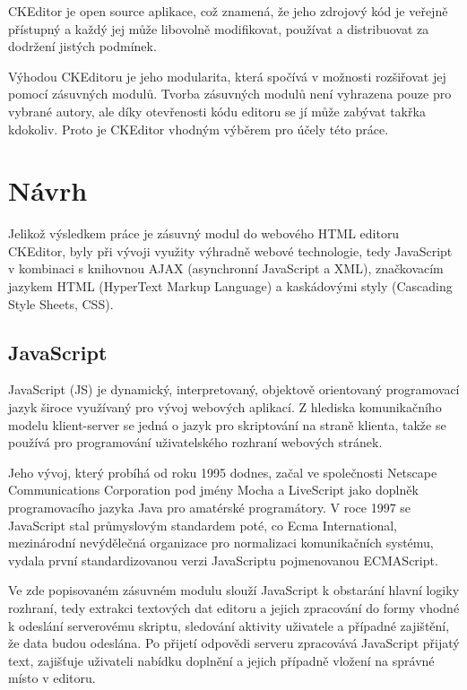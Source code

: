\documentclass[a4paper,11pt]{article}
\begin{document}
CKEditor je open source aplikace, což znamená, že jeho zdrojový kód je veřejně přístupný a každý jej může libovolně modifikovat, používat a distribuovat za dodržení jistých podmínek. 

Výhodou CKEditoru je jeho modularita, která spočívá v možnosti rozšiřovat jej pomocí zásuvných modulů. Tvorba zásuvných modulů není vyhrazena pouze pro vybrané autory, ale  díky otevřenosti kódu editoru se jí může zabývat takřka kdokoliv. Proto je CKEditor vhodným výběrem pro účely této práce. %

\section{Návrh}

Jelikož výsledkem práce je zásuvný modul do webového HTML editoru CKEditor, byly při vývoji využity výhradně webové technologie, tedy JavaScript v kombinaci s knihovnou AJAX (asynchronní JavaScript a XML), značkovacím jazykem HTML (HyperText Markup Language) a kaskádovými styly (Cascading Style Sheets, CSS). 

\subsection{JavaScript}

JavaScript (JS) je dynamický, interpretovaný, objektově orientovaný programovací jazyk široce využívaný pro vývoj webových aplikací. Z hlediska komunikačního modelu klient-server se jedná o jazyk pro skriptování na straně klienta, takže se používá pro programování uživatelského rozhraní webových stránek. %


Jeho vývoj, který probíhá od roku 1995 dodnes, začal ve společnosti Netscape Communications Corporation pod jmény Mocha a LiveScript jako doplněk programovacího jazyka Java pro amatérské programátory. V roce 1997 se JavaScript stal průmyslovým standardem poté, co Ecma International, mezinárodní nevýdělečná organizace pro normalizaci komunikačních systému, vydala první standardizovanou verzi JavaScriptu pojmenovanou ECMAScript. %

Ve zde popisovaném zásuvném modulu slouží JavaScript k obstarání hlavní logiky rozhraní, tedy extrakci textových dat editoru a jejich zpracování do formy vhodné k odeslání serverovému skriptu, sledování aktivity uživatele a případné zajištění, že data budou odeslána. Po přijetí odpovědi serveru zpracovává JavaScript přijatý text, zajišťuje uživateli nabídku doplnění a jejich případně vložení na správné místo v editoru. 
\end{document}
